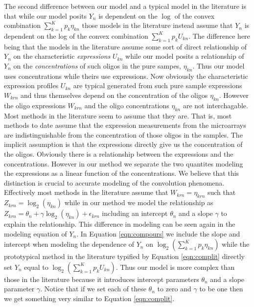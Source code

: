 \documentclass[reqno,12pt,oneside]{report}\usepackage[]{graphicx}\usepackage[]{color}
\theoremstyle{plain}
\theoremstyle{definition}
\theoremstyle{remark}
\numberwithin{theorem}{chapter}     %
\begin{document}
The second difference between our model and a typical model in the literature is that while our model posits $Y_n$ is dependent on the $\log$ of the convex combination $\sum_{k=1}^{K}p_k\eta_{kn}$ those models in the literature instead assume that $Y_n$ is dependent on the log of the convex combination $\sum_{k=1}^{K}p_kU_{kn}$. The difference here being that the models in the literature assume some sort of direct relationship of $Y_n$ on the characteristic \emph{expressions} $U_{kn}$ while our model posits a relationship of $Y_n$ on the \emph{concentrations} of such oligos in the pure sampes, $\eta_{kn}$. Thus our model uses concentrations while theirs use expressions.  Now obviously the characteristic expression profiles $U_{kn}$ are typical generated from such pure sample expressions $W_{krn}$ and thus themselves depend on the concentration of the oligos $\eta_{kn}$. However the oligo expressions $W_{krn}$ and the oligo concentrations $\eta_{kn}$ are not interchagable. Most methods in the literature seem to assume that they are. That is, most methods to date assume that the expression measurements from the microarrays are indistinguishable from the concentration of those oligos in the samples. The implicit assumption is that the expressions directly give us the concentration of the oligos. Obviously there is a relationship between the expressions and the concentrations. However in our method we separate the two quantites modeling the expressions as a linear function of the concentrations. We believe that this distinction is crucial to accurate modeling of the convolution phenomena. Effectively most methods in the literature assume that $W_{krn} = \eta_{krn}$ such that $Z_{krn} = \log_2\left(\eta_{kn}\right)$ while in our method we model the relationship as $Z_{krn}=\theta_n+\gamma\log_2\left(\eta_{kn}\right)+\epsilon_{krn}$ including an intercept $\theta_n$ and a slope $\gamma$ to explain the relationship. This difference in modeling can be seen again in the modeling equation of $Y_n$. In Equation \ref{eqn:compours} we include the slope and intercept when modeling the dependence of $Y_n$ on $\log_2\left(\sum_{k=1}^{K}p_k\eta_{kn}\right)$ while the prototypical method in the literature typified by Equation \ref{eqn:complit} directly set $Y_n$ equal to $\log_2\left(\sum_{k=1}^{K}p_kU_{kn}\right)$. Thus our model is more complex than those in the literature because it introduces intercept parameters $\theta_n$ and a slope parameter $\gamma$. Notice that if we set each of these $\theta_n$ to zero and $\gamma$ to be one then we get something very similar to Equation \ref{eqn:complit}.
\end{document}
